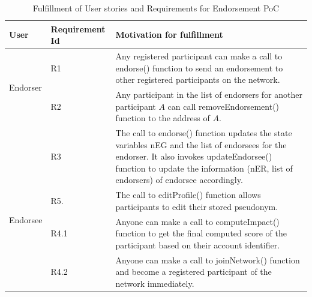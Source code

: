 \begin{center} \label{table:fulfillment} 
	\begin{table}
		\begin{tabular} {| l | l | p{9cm} | }
		\hline
		\textbf{User}  & \textbf{Requirement Id}   & \textbf{Motivation for fulfillment} \\
		\hline
		\multirow{2}{*}{Endorser} & R1 & Any registered participant can make a
		call to endorse() function to send an endorsement to other registered
		participants on the network. 
		\\\cline{2-3} 
		& R2  & Any participant in the list of endorsers for another
		participant $A$ can call removeEndorsement() function to the address of
		$A$.
		\\\cline{2-3}
		& R3 & The call to endorse() function updates the state variables
		\ac{nEG} and the list of endorsees for the endorser. It also invokes
		updateEndorsee() function to update the information (\ac{nER}, list of
		endorsers) of endorsee accordingly. 
		\\\cline{2-3}
		\hline
		\multirow{2}{*}{Endorsee} & R5.& The call to editProfile() function
		allows participants to edit their stored pseudonym.
		\\\cline{2-3}
		\hline
		\multirow{2}{*}{other users} & R4.1 & Anyone can make a call to
		computeImpact() function to get the final computed score of the
		participant based on their account identifier.
		\\\cline{2-3}
		& R4.2 & Anyone can make a call to joinNetwork() function and become a
		registered participant of the network immediately.  
		\\\cline{2-3}
		\hline
	\end{tabular}
	\caption{Fulfillment of User stories and Requirements for Endorsement PoC}
\end{table}
\end{center}
%
%		
\vspace{-15mm}
